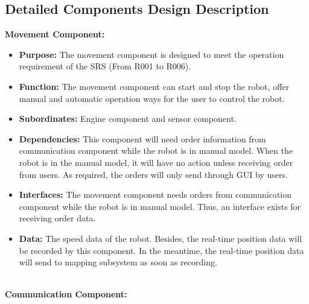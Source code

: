\documentclass[11pt, a4paper]{article}
\begin{document}
\subsection{Detailed Components Design Description}
\textbf{Movement Component:}
\begin{itemize}
\item {\bfseries Purpose: }The movement component is designed to meet the operation requirement of the SRS (From R001 to R006).
\item {\bfseries Function: }The movement component can start and stop the robot, offer manual and automatic operation ways for the user to control the robot.
\item {\bfseries Subordinates: }Engine component and sensor component.
\item {\bfseries Dependencies: }This component will need order information from communication component while the robot is in manual model. When the robot is in the manual model, it will have no action unless receiving order from users. As required, the orders will only send through GUI by users.\item {\bfseries Interfaces: }The movement component needs orders from communication component while the robot is in manual model. Thus, an interface exists for receiving order data.
\item {\bfseries Data: }The speed data of the robot. Besides, the real-time position data will be recorded by this component. In the meantime, the real-time position data will send to mapping subsystem as soon as recording.
\end{itemize}
\\
\textbf{Communication Component:}
\end{document}
